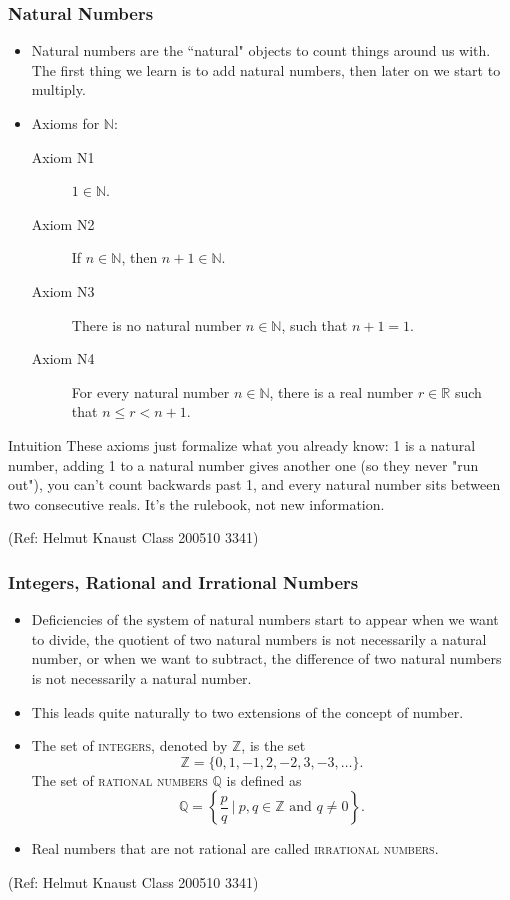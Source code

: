  \begin{frame}[fragile]\frametitle{Natural Numbers}
\begin{itemize}
\item Natural numbers are the ``natural" objects to count things around
us with. The first thing we learn is to add natural numbers, then
later on we start to multiply.
\item Axioms for $\mathbb{N}$:
\begin{description}
\item[Axiom N1] $1\in\mathbb{N}$.
\item[Axiom N2] If $n\in\mathbb{N}$, then $n+1\in\mathbb{N}$.
\item[Axiom N3] There is no natural number $n\in\mathbb{N}$, such that $n+1=1$.
\item[Axiom N4] For every natural number $n\in\mathbb{N}$, there is a
real number $r\in\mathbb{R}$ such that $n\leq r<n+1$.
\end{description}
\end{itemize}

\begin{block}{Intuition}
These axioms just formalize what you already know: 1 is a natural number, adding 1 to a natural number gives another one (so they never "run out"), you can't count backwards past 1, and every natural number sits between two consecutive reals. It's the rulebook, not new information.
\end{block}

\tiny{(Ref: Helmut Knaust Class 200510 3341)}

\end{frame}

 \begin{frame}[fragile]\frametitle{Integers, Rational and Irrational Numbers}
\begin{itemize}
\item Deficiencies of the system of natural numbers start to appear
when we want to divide, the quotient of two natural numbers is
not necessarily a natural number, or when we want to
subtract, the difference of two natural numbers is not
necessarily a natural number. 
\item This leads quite naturally to two
extensions of the concept of number.
\item The set of \textsc{integers}, denoted by $\mathbb{Z}$, is the set
\[{\mathbb{Z}}=\{0,1,-1,2,-2,3,-3,\ldots\}.\]
The set of \textsc{rational numbers} $\mathbb{Q}$ is defined as
\[\mathbb{Q}=\left\{\frac{p}{q} \ \left|\ p,q\in\mathbb{Z}\mbox{ and }
q\not=0\right.\right\}.\]
\item Real numbers that are not rational are called \textsc{irrational
numbers}. 
\end{itemize}

\tiny{(Ref: Helmut Knaust Class 200510 3341)}

\end{frame}

